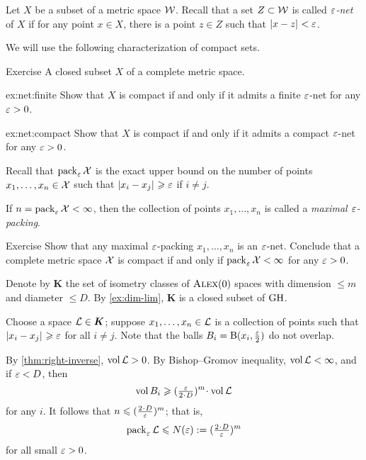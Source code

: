 Let $X$ be a subset of a metric space $\mathcal{W}$.
Recall that a set $Z\subset \mathcal{W}$ is called \emph{$\varepsilon$-net} of $X$ if for any point $x\in X$, there is a point $z\in Z$ such that $\dist{x}{z}{}<\eps$.

We will use the following characterization of compact sets.

\begin{thm}{Exercise}\label{ex:net}
A closed subset $X$ of a complete metric space.

\begin{subthm}{ex:net:finite}
Show that $X$ is compact if and only if it admits a finite $\varepsilon$-net for any $\varepsilon>0$.
\end{subthm}

\begin{subthm}{ex:net:compact}
Show that $X$ is compact if and only if it admits a compact $\varepsilon$-net for any $\varepsilon>0$.
\end{subthm}

\end{thm}

Recall that $\operatorname{\rm pack}\nolimits_\varepsilon\mathcal{X}$ is the exact upper bound on the number of points $x_1,\z\dots,x_n\in \spc{X}$ such that $\dist{x_i}{x_j}{}\ge\eps$ if $i\ne j$.

If $n=\operatorname{\rm pack}\nolimits_\varepsilon\mathcal{X}<\infty$, then
the collection of points $x_1,\dots,x_n$ is called a \emph{maximal $\varepsilon$-packing}.

\begin{thm}{Exercise}\label{ex:pack-net}
Show that any maximal $\varepsilon$-packing $x_1,\dots,x_n$ is an $\varepsilon$-net.
Conclude that a complete metric space $\mathcal{X}$ is compact if and only if $\pack_\eps\spc{X}\z<\infty$ for any $\varepsilon>0$.
\end{thm}


Denote by $\bm{K}$ the set of isometry classes of $\textsc{Alex}(0)$ spaces with dimension $\le m$ and diameter $\le D$.
By \ref{ex:dim-lim}, $\bm{K}$ is a closed subset of $\operatorname{\rm GH}\nolimits$.

Choose a space $\mathcal{L}\in \bm{K}$;
suppose $x_1,\dots,x_n\in \mathcal{L}$ is a collection of points such that $\dist{x_i}{x_j}{}\ge \eps$ for all $i\ne j$.
Note that the balls $B_i=\mathrm{B}{}(x_i,\tfrac{\varepsilon}2)$ do not overlap.

By \ref{thm:right-inverse}, $\operatorname{\rm vol}\nolimits \mathcal{L}>0$.
By Bishop--Gromov inequality, $\operatorname{\rm vol}\nolimits \mathcal{L}<\infty$,
and if $\varepsilon<D$, then 
\[\vol B_i\ge (\tfrac\eps{2\cdot D})^m\cdot\vol \spc{L}\]
for any $i$.
It follows that $n\le (\tfrac{2\cdot D}\eps)^m$;
that is, 
\[\pack_\eps\spc{L}\le  N(\eps)\df(\tfrac{2\cdot D}\eps)^m\]
for all small $\varepsilon>0$.

